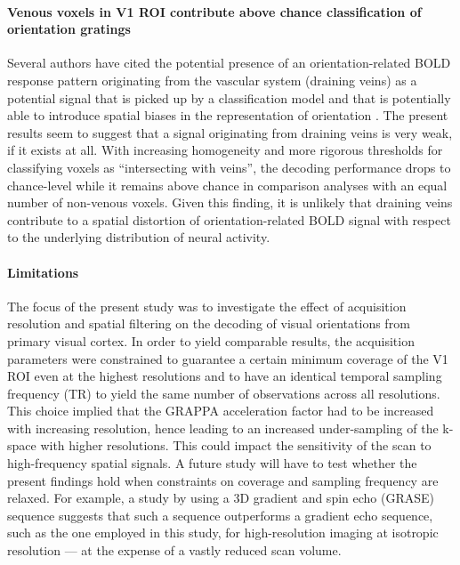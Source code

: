 \paragraph*{Venous voxels in V1 ROI contribute above chance classification of
orientation gratings}
%
Several authors have cited the potential presence of an orientation-related
BOLD response pattern originating from the vascular system (draining veins) as
a potential signal that is picked up by a classification model and that is
potentially able to introduce spatial biases in the representation of
orientation \citep{kriegeskorte_2010, chaimow_2011, shmuel_2010}. The present
results seem to suggest that a signal originating from draining veins is very
weak, if it exists at all. With increasing homogeneity and more rigorous
thresholds for classifying voxels as ``intersecting with veins'', the decoding
performance drops to chance-level while it remains above chance in comparison
analyses with an equal number of non-venous voxels. Given this finding, it is
unlikely that draining veins contribute to a spatial distortion of
orientation-related BOLD signal with respect to the underlying distribution of
neural activity.


\paragraph*{Limitations}

The focus of the present study was to investigate the effect of acquisition
resolution and spatial filtering on the decoding of visual orientations from
primary visual cortex. In order to yield comparable results, the acquisition
parameters were constrained to guarantee a certain minimum coverage of the V1
ROI even at the highest resolutions and to have an identical temporal sampling
frequency (TR) to yield the same number of observations across all resolutions.
This choice implied that the GRAPPA acceleration factor had to be increased
with increasing resolution, hence leading to an increased under-sampling of the
k-space with higher resolutions. This could impact the sensitivity of the scan
to high-frequency spatial signals. A future study will have to test whether the
present findings hold when constraints on coverage and sampling frequency are
relaxed. For example, a study by \cite{demartino2013grase} using a 3D gradient
and spin echo (GRASE) sequence suggests that such a sequence outperforms a
gradient echo sequence, such as the one employed in this study, for
high-resolution imaging at  isotropic resolution --- at the expense of a
vastly reduced scan volume.

